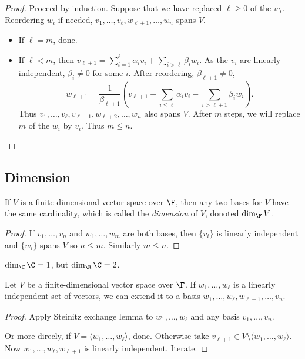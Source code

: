 \documentclass[a4paper]{article}
\theoremstyle{definition}
\begin{document}
\begin{proof}
  Proceed by induction. Suppose that we have replaced $\ell \geq 0$ of the $w_i$. Reordering $w_i$ if needed, $v_1,\ldots,v_\ell,w_{\ell+1},\ldots,w_n$ spans $V$.
  \begin{itemize}
  \item If $\ell = m$, done.
  \item If $\ell < m$, then $v_{\ell+1} = \sum_{i=1}^\ell \alpha_i v_i + \sum_{i> \ell} \beta_i w_i$. As the $v_i$ are linearly independent, $\beta_i \neq 0$ for some $i$. After reordering, $\beta_{\ell+1} \neq 0$,
    \[
      w_{\ell+1} = \frac{1}{\beta_{\ell+1}} (v_{\ell+1}-\sum_{i\leq \ell} \alpha_i v_i - \sum_{i>\ell+1} \beta_i w_i).
    \]
    Thus $v_1,\ldots, v_\ell, v_{\ell+1},w_{\ell+2},\ldots, w_n$ also spans $V$. After $m$ steps, we will replace $m$ of the $w_i$ by $v_i$. Thus $m \leq n$.
  \end{itemize}
\end{proof}

\subsection{Dimension}

\begin{thm}
  If $V$ is a finite-dimensional vector space over $\F$, then any two bases for $V$ have the same cardinality, which is called the \emph{dimension} of $V$, donoted $\dim_\F V$.
\end{thm}

\begin{proof}
  If $v_1,\ldots, v_n$ and $w_1,\ldots,w_m$ are both bases, then $\{v_i\}$ is linearly independent and $\{w_i\}$ spans $V$ so $n \leq m$. Similarly $m \leq n$.
\end{proof}

\begin{eg}
  $\dim_\C \C = 1$, but $\dim_\R \C = 2$.
\end{eg}

\begin{lem}
  Let \(V\) be a finite-dimensional vector space over \(\F\). If \(w_1,\ldots,w_\ell\) is a linearly independent set of vectors, we can extend it to a basis \(w_1,\ldots,w_\ell,w_{\ell+1},\ldots,v_n\).
\end{lem}

\begin{proof}
  Apply Steinitz exchange lemma to \(w_1,\ldots, w_\ell\) and any basis \(v_1,\ldots, v_n\).

  Or more direcly, if \(V=\langle w_1,\ldots, w_\ell \rangle\), done. Otherwise take \(v_{\ell+1} \in V\setminus\langle w_1,\ldots, w_\ell\rangle\). Now \(w_1,\ldots, w_\ell,w_{\ell+1}\) is linearly independent. Iterate.
\end{proof}
\end{document}
